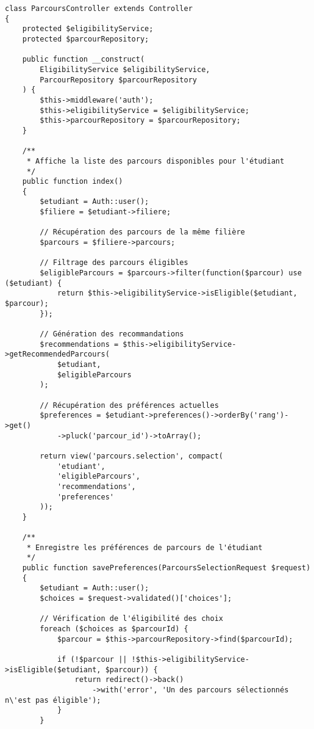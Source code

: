 \documentclass[french,12pt]{report} %
\begin{document}
\begin{lstlisting}[style=phpstyle,caption={ParcoursController - Gestion de la sélection des parcours}]
class ParcoursController extends Controller
{
    protected $eligibilityService;
    protected $parcourRepository;
    
    public function __construct(
        EligibilityService $eligibilityService,
        ParcourRepository $parcourRepository
    ) {
        $this->middleware('auth');
        $this->eligibilityService = $eligibilityService;
        $this->parcourRepository = $parcourRepository;
    }
    
    /**
     * Affiche la liste des parcours disponibles pour l'étudiant
     */
    public function index()
    {
        $etudiant = Auth::user();
        $filiere = $etudiant->filiere;
        
        // Récupération des parcours de la même filière
        $parcours = $filiere->parcours;
        
        // Filtrage des parcours éligibles
        $eligibleParcours = $parcours->filter(function($parcour) use ($etudiant) {
            return $this->eligibilityService->isEligible($etudiant, $parcour);
        });
        
        // Génération des recommandations
        $recommendations = $this->eligibilityService->getRecommendedParcours(
            $etudiant, 
            $eligibleParcours
        );
        
        // Récupération des préférences actuelles
        $preferences = $etudiant->preferences()->orderBy('rang')->get()
            ->pluck('parcour_id')->toArray();
        
        return view('parcours.selection', compact(
            'etudiant', 
            'eligibleParcours', 
            'recommendations',
            'preferences'
        ));
    }
    
    /**
     * Enregistre les préférences de parcours de l'étudiant
     */
    public function savePreferences(ParcoursSelectionRequest $request)
    {
        $etudiant = Auth::user();
        $choices = $request->validated()['choices'];
        
        // Vérification de l'éligibilité des choix
        foreach ($choices as $parcourId) {
            $parcour = $this->parcourRepository->find($parcourId);
            
            if (!$parcour || !$this->eligibilityService->isEligible($etudiant, $parcour)) {
                return redirect()->back()
                    ->with('error', 'Un des parcours sélectionnés n\'est pas éligible');
            }
        }
        

\end{lstlisting}
\end{document}
